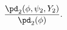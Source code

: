 \begin{equation}
  \frac {
      \pd_{2}(\phi, \psi_{2}, Y_{2})
  } {
      \pd_{2}(\phi)
  }.
  \label{eqn:stage_one_target}
\end{equation}